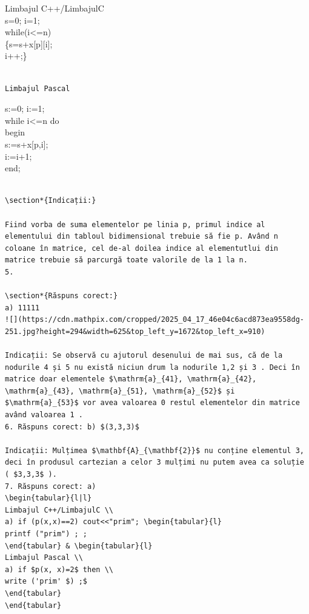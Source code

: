 \documentclass[10pt]{article}
\begin{document}
Limbajul C++/LimbajulC\\
s=0; i=1;\\
while(i<=n)\\[0pt]
\{s=s+x[p][i];\\
i++;\}

\begin{verbatim}

Limbajul Pascal
\end{verbatim}

s:=0; i:=1;\\
while i<=n do\\
begin\\[0pt]
s:=s+x[p,i];\\
i:=i+1;\\
end;

\begin{verbatim}

\section*{Indicații:}

Fiind vorba de suma elementelor pe linia p, primul indice al elementului din tabloul bidimensional trebuie să fie p. Având n coloane în matrice, cel de-al doilea indice al elementutlui din matrice trebuie să parcurgă toate valorile de la 1 la n.
5.

\section*{Răspuns corect:}
a) 11111
![](https://cdn.mathpix.com/cropped/2025_04_17_46e04c6acd873ea9558dg-251.jpg?height=294&width=625&top_left_y=1672&top_left_x=910)

Indicații: Se observă cu ajutorul desenului de mai sus, că de la nodurile 4 și 5 nu există niciun drum la nodurile 1,2 și 3 . Deci în matrice doar elementele $\mathrm{a}_{41}, \mathrm{a}_{42}, \mathrm{a}_{43}, \mathrm{a}_{51}, \mathrm{a}_{52}$ și $\mathrm{a}_{53}$ vor avea valoarea 0 restul elementelor din matrice având valoarea 1 .
6. Răspuns corect: b) $(3,3,3)$

Indicații: Mulțimea $\mathbf{A}_{\mathbf{2}}$ nu conține elementul 3, deci în produsul cartezian a celor 3 mulțimi nu putem avea ca soluție ( $3,3,3$ ).
7. Răspuns corect: a)
\begin{tabular}{l|l} 
Limbajul C++/LimbajulC \\
a) if (p(x,x)==2) cout<<"prim"; \begin{tabular}{l} 
printf ("prim") ; ;
\end{tabular} & \begin{tabular}{l} 
Limbajul Pascal \\
a) if $p(x, x)=2$ then \\
write ('prim' $) ;$
\end{tabular}
\end{tabular}


\end{verbatim}
\end{document}

